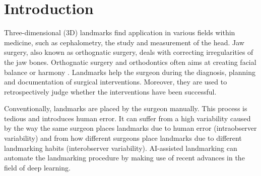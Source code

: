 
% 

 
 




\section{Introduction}
\label{sec:introduction}
Three-dimensional (3D) landmarks find application in various fields within medicine, such as cephalometry, the study and measurement of the head. Jaw surgery, also known as orthognatic surgery, deals with correcting irregularities of the jaw bones. Orthognatic surgery and orthodontics often aims at creating facial balance or harmony \cite{Plooij2009}. Landmarks help the surgeon during the diagnosis, planning and documentation of surgical interventions. Moreover, they are used to retrospectively judge whether the interventions have been successful. %

Conventionally, landmarks are placed by the surgeon %
manually. This process is tedious and introduces human error. It can suffer from a high variability caused by the way the same surgeon places landmarks due to human error (intraobserver variability) and from how different surgeons place landmarks due to different landmarking habits (interobserver variability).
AI-assisted landmarking can automate the landmarking procedure by making use of recent advances in the field of deep learning.

